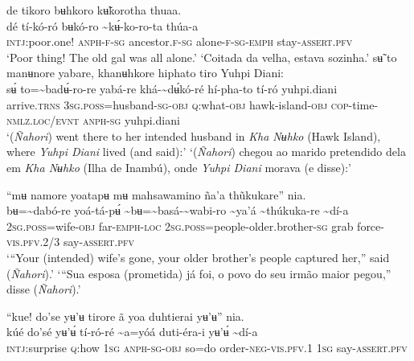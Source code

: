 \documentclass[output=paper,
modfonts,nonflat
]{langsci/langscibook}
\begin{document}
\ea de tikoro bʉhkoro kʉ̃korotha thuaa.\\[.3em]
\gll dé	tí-kó-ró	bʉkó-ro	{\textasciitilde}kʉ́-ko-ro-ta	thúa-a\\
     \textsc{intj}:poor.one!	\textsc{anph-f-sg}	ancestor.\textsc{f}\textsc{-sg} 	alone-\textsc{f-sg-emph}	stay-\textsc{assert.pfv}\\
\glt ‘Poor thing! The old gal was all alone.’
\glt ‘Coitada da velha, estava sozinha.’
\z 
\ea sʉ̃ to manʉnore yabare, khanʉhkore hiphato tiro Yuhpi Diani: \\[.3em]
\gll {\textasciitilde}sʉ́	to={\textasciitilde}badʉ́-ro-re	yabá-re	khá-{\textasciitilde}dʉ́kó-ré	hí-pha-to	tí-ró yuhpi.diani\\
     arrive.\textsc{trns}	3\textsc{sg.poss}=husband\textsc{-sg-obj}	\textsc{q:}what\textsc{-obj}	hawk-island\textsc{-obj}	\textsc{cop-}time-\textsc{nmlz.loc/evnt}	\textsc{anph-sg} yuhpi.diani\\
\glt ‘(\textit{Ñahori}) went there to her intended husband in \textit{Kha Nʉhko} (Hawk Island), where \textit{Yuhpi Diani} lived (and said):’
\glt ‘(\textit{Ñahori}) chegou ao marido pretendido dela em \textit{Kha Nʉhko} (Ilha de Inambú), onde \textit{Yuhpi Diani} morava (e disse):’
\z 

\largerpage[2]
\ea “mʉ namore yoatapʉ mʉ mahsawamino ña'a thũkukare” nia. \\[.3em]
\gll{\textasciitilde}bʉ={\textasciitilde}dabó-re	yoá-tá-pʉ́	{\textasciitilde}bʉ={\textasciitilde}basá-{\textasciitilde}wabi-ro	{\textasciitilde}ya'á {\textasciitilde}thúkuka-re	{\textasciitilde}dí-a\\
     2\textsc{sg.poss}=wife\textsc{-obj}	far-\textsc{emph-loc}	2\textsc{sg.poss}=people-older.brother\textsc{-sg}	grab force-\textsc{vis.pfv.}2/3	say-\textsc{assert.pfv} \\
\glt ‘“Your (intended) wife's gone, your older brother’s people captured her,” said (\textit{Ñahori}).’
\newpage 
\glt ‘“Sua esposa (prometida) já foi, o povo do seu irmão maior pegou,” disse (\textit{Ñahori}).’
\z 

\ea “kue! do'se yʉ’ʉ tirore ã yoa duhtierai yʉ’ʉ” nia. \\[.3em]
\gll kúé	do'sé	yʉ’ʉ́	tí-ró-ré	{\textasciitilde}a=yóá	duti-éra-i	yʉ’ʉ́	{\textasciitilde}dí-a \\
     \textsc{intj:}surprise	\textsc{q:}how	1\textsc{sg}	\textsc{anph-sg-obj}	so=do	order-\textsc{neg-vis.pfv.}1	1\textsc{sg} say-\textsc{assert.pfv}\\
 
\end{document}
